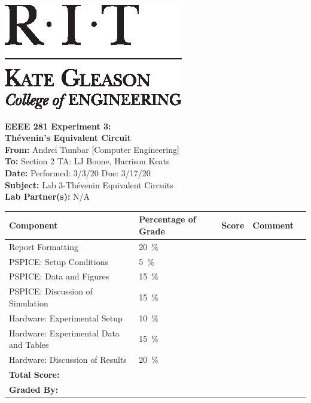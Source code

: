 \documentclass[11pt]{article}
\begin{document}
	\hspace{6in}
		\includegraphics[scale=0.9,trim=0cm 0in 0in 0.0in,clip]{RIT_KGCOE1}
\newline

\Huge \textbf{EEEE 281 Experiment 3:\\ Th\'evenin's Equivalent Circuit}\\

\Large
\textbf{From:} Andrei Tumbar [Computer Engineering] \\
\textbf{To: } Section 2 TA: LJ Boone, Harrison Keats \\
\textbf{Date: } Performed: 3/3/20  Due: 3/17/20 \\
\textbf{Subject: } Lab 3-Th\'evenin Equivalent Circuits\\
\textbf{Lab Partner(s): } N/A\\
\vspace{0.5in}
	\begin{table}[h!]
		\centering
		\begin{tabular}{|l||l|l|l|l|}
			\hline
			Component & Percentage of Grade   & Score \hspace{0.5in} & Comment \hspace{0.5in}  \\
			\hline
			Report Formatting & 20~\si{\percent} & & \\	 
			\hline
			\hline 
			PSPICE: Setup Conditions & 5~\si{\percent} & & \\	 
			 \hline
			PSPICE: Data and Figures & 15~\si{\percent} & & \\	 
			 \hline
			PSPICE: Discussion of Simulation & 15~\si{\percent} & & \\	 
			\hline
			\hline
			Hardware: Experimental Setup & 10~\si{\percent} & & \\	 
			\hline
			Hardware: Experimental Data and Tables & 15~\si{\percent} & & \\	 
			\hline
			Hardware: Discussion of Results & 20~\si{\percent} & & \\	 
			\hline
			\hline
			\textbf{Total Score:}&  & & \\	 
			\hline
			\textbf{Graded By:}&  & & \\	 
			\hline
		\end{tabular}
	\end{table}
\newpage
\end{document}
